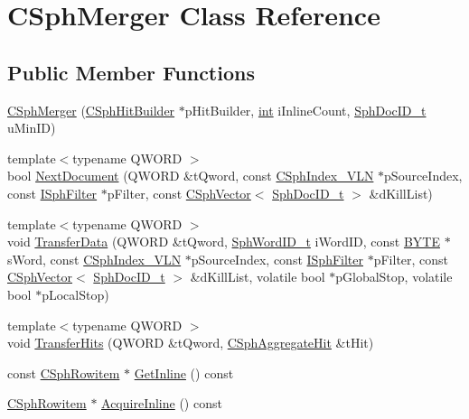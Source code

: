 \hypertarget{classCSphMerger}{\section{C\-Sph\-Merger Class Reference}
\label{classCSphMerger}
}
\subsection*{Public Member Functions}
\begin{DoxyCompactItemize}
\item 
\hyperlink{classCSphMerger_a5cf73c8d8c794fa6babf4246a826539c}{C\-Sph\-Merger} (\hyperlink{classCSphHitBuilder}{C\-Sph\-Hit\-Builder} $\ast$p\-Hit\-Builder, \hyperlink{sphinxexpr_8cpp_a4a26e8f9cb8b736e0c4cbf4d16de985e}{int} i\-Inline\-Count, \hyperlink{sphinx_8h_a3176771631c12a9e4897272003e6b447}{Sph\-Doc\-I\-D\-\_\-t} u\-Min\-I\-D)
\item 
{\footnotesize template$<$typename Q\-W\-O\-R\-D $>$ }\\bool \hyperlink{classCSphMerger_a9e3311102750faf264a875f360957e6e}{Next\-Document} (Q\-W\-O\-R\-D \&t\-Qword, const \hyperlink{classCSphIndex__VLN}{C\-Sph\-Index\-\_\-\-V\-L\-N} $\ast$p\-Source\-Index, const \hyperlink{structISphFilter}{I\-Sph\-Filter} $\ast$p\-Filter, const \hyperlink{classCSphVector}{C\-Sph\-Vector}$<$ \hyperlink{sphinx_8h_a3176771631c12a9e4897272003e6b447}{Sph\-Doc\-I\-D\-\_\-t} $>$ \&d\-Kill\-List)
\item 
{\footnotesize template$<$typename Q\-W\-O\-R\-D $>$ }\\void \hyperlink{classCSphMerger_add2b536b5d1554cb980addaad08950e7}{Transfer\-Data} (Q\-W\-O\-R\-D \&t\-Qword, \hyperlink{sphinx_8h_a80a94d5984fdf9214a98f3e5e65df963}{Sph\-Word\-I\-D\-\_\-t} i\-Word\-I\-D, const \hyperlink{sphinxstd_8h_a4ae1dab0fb4b072a66584546209e7d58}{B\-Y\-T\-E} $\ast$s\-Word, const \hyperlink{classCSphIndex__VLN}{C\-Sph\-Index\-\_\-\-V\-L\-N} $\ast$p\-Source\-Index, const \hyperlink{structISphFilter}{I\-Sph\-Filter} $\ast$p\-Filter, const \hyperlink{classCSphVector}{C\-Sph\-Vector}$<$ \hyperlink{sphinx_8h_a3176771631c12a9e4897272003e6b447}{Sph\-Doc\-I\-D\-\_\-t} $>$ \&d\-Kill\-List, volatile bool $\ast$p\-Global\-Stop, volatile bool $\ast$p\-Local\-Stop)
\item 
{\footnotesize template$<$typename Q\-W\-O\-R\-D $>$ }\\void \hyperlink{classCSphMerger_a403304810ff1b3761f103e01b55995b8}{Transfer\-Hits} (Q\-W\-O\-R\-D \&t\-Qword, \hyperlink{structCSphAggregateHit}{C\-Sph\-Aggregate\-Hit} \&t\-Hit)
\item 
const \hyperlink{sphinx_8h_a6a2df0f05f3397df8b6e230fda6f852f}{C\-Sph\-Rowitem} $\ast$ \hyperlink{classCSphMerger_add134535bc096d10a31c322a5e7d025a}{Get\-Inline} () const 
\item 
\hyperlink{sphinx_8h_a6a2df0f05f3397df8b6e230fda6f852f}{C\-Sph\-Rowitem} $\ast$ \hyperlink{classCSphMerger_a997c8cbecfbfff516dc6ef466e6f7927}{Acquire\-Inline} () const 
\end{DoxyCompactItemize}
